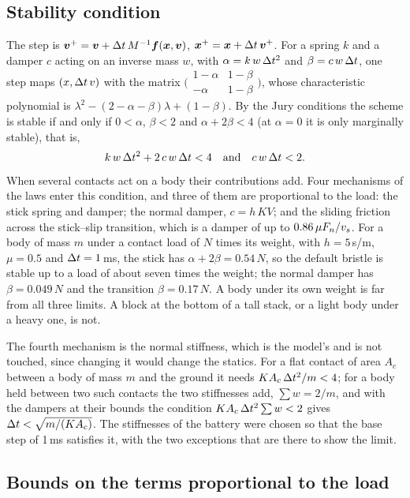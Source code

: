 \subsection{Stability condition}

The step is $\boldsymbol{v}^+ = \boldsymbol{v} + \Delta t\,M^{-1}\boldsymbol{f}(\boldsymbol{x},\boldsymbol{v})$, $\boldsymbol{x}^+ = \boldsymbol{x} + \Delta t\,\boldsymbol{v}^+$. For a spring
$k$ and a damper $c$ acting on an inverse mass $w$, with $\alpha = k\,w\,\Delta t^2$ and
$\beta = c\,w\,\Delta t$, one step maps $(x, \Delta t\,v)$ with the matrix
$\bigl(\begin{smallmatrix} 1-\alpha & 1-\beta\\ -\alpha & 1-\beta\end{smallmatrix}\bigr)$, whose characteristic
polynomial is $\lambda^2 - (2-\alpha-\beta)\lambda + (1-\beta)$. By the Jury conditions the scheme is stable
if and only if $0 < \alpha$, $\beta < 2$ and $\alpha + 2\beta < 4$ (at $\alpha = 0$ it is only marginally stable), that is,
\begin{equation}
  k\,w\,\Delta t^2 + 2\,c\,w\,\Delta t < 4 \quad\text{and}\quad c\,w\,\Delta t < 2 .
  \label{eq:sup-stability}
\end{equation}
When several contacts act on a body their contributions add. Four mechanisms of the laws enter
this condition, and three of them are proportional to the load: the stick spring and damper;
the normal damper, $c = h\,K V$; and the sliding friction across the stick--slip transition,
which is a damper of up to $0.86\,\mu F_n/v_s$. For a body of mass $m$ under a contact load of
$N$ times its weight, with $h = 5$\,s/m, $\mu = 0.5$ and $\Delta t = 1$\,ms, the stick has
$\alpha + 2\beta = 0.54\,N$, so the default bristle is stable up to a load of about seven times
the weight; the normal damper has $\beta = 0.049\,N$ and the transition $\beta = 0.17\,N$. A
body under its own weight is far from all three limits. A block at the bottom of a tall stack,
or a light body under a heavy one, is not.

The fourth mechanism is the normal stiffness, which is the model's and is not touched, since
changing it would change the statics. For a flat contact of area $A_c$ between a body of mass
$m$ and the ground it needs $K A_c\,\Delta t^2/m < 4$; for a body held between two such contacts the
two stiffnesses add, $\sum w = 2/m$, and with the dampers at their bounds the condition
$K A_c\,\Delta t^2\sum w < 2$ gives $\Delta t < \sqrt{m/(K A_c)}$. The stiffnesses of the battery were
chosen so that the base step of 1\,ms satisfies it, with the two exceptions that are there to
show the limit.

\subsection{Bounds on the terms proportional to the load}\label{sup:bounds}

